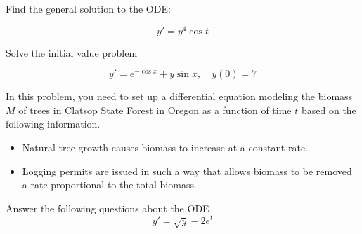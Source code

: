 \documentclass[addpoints,12pt]{exam}
\begin{document}
\newpage
\begin{questions}

\question[10] Find the general solution to the ODE:

$$y'=y^4\cos t$$
\newpage

\question[10] Solve the initial value problem

$$y'=e^{-\cos x}+y\sin x,\quad y(0)=7$$

\newpage

\question[6] In this problem, you need to set up a differential equation modeling the biomass $M$ of trees in Clatsop State Forest in Oregon as a function of time $t$ based on the following information.
 \begin{itemize}
  \item Natural tree growth causes biomass to increase at a constant rate.
  \item Logging permits are issued in such a way that allows biomass to be removed a rate proportional to the total biomass.
 \end{itemize}
 
 
 \newpage

\question[8] Answer the following questions about the ODE
$$y'=\sqrt y - 2e^{t}$$

\end{questions}
\end{document}
